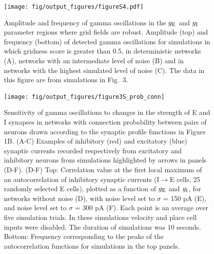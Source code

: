 \documentclass[a4paper,12pt]{article}
\newcommand{\ssc}[3]{\ensuremath{#1_{\text{#2}_{\text{#3}}}}}
\newcommand{\gE      }{\ssc{g}      {\scriptsize{E}}{}}
\newcommand{\gI      }{\ssc{g}      {\scriptsize{I}}{}}
\begin{document}
\clearpage

\begin{figure}[p]
    \internallinenumbers
    \centering
        \texttt{[image: fig/output\_figures/figureS4.pdf]}
    \caption{Amplitude and frequency of gamma oscillations in the $\gE$ and
    $\gI$ parameter regions where grid fields are robust. Amplitude (top) and
    frequency (bottom) of detected gamma oscillations for simulations in which
    gridness score is greater than 0.5, in deterministic networks (A), networks
    with an intermediate level of noise (B) and in networks with the highest
    simulated level of noise (C). The data in this figure are from simulations
    in Fig.~3.}
\end{figure}

\clearpage

\begin{figure}[p]
    \internallinenumbers
    \centering
        \texttt{[image: fig/output\_figures/figure3S\_prob\_conn]}
\end{figure}

\clearpage

\begin{figure}[H]
    \internallinenumbers
    \caption{Sensitivity of gamma oscillations to changes in the strength of E
    and I synapses in networks with connection probability between pairs of
    neurons drawn according to the synaptic profile functions in Figure 1B.
    (A-C) Examples of inhibitory (red) and excitatory (blue) synaptic currents
    recorded respectively from excitatory and inhibitory neurons from
    simulations highlighted by arrows in panels (D-F).  (D-F) Top: Correlation
    value at the first local maximum of an autocorrelation of inhibitory
    synaptic currents (I$\rightarrow$E cells, 25 randomly selected E cells),
    plotted as a function of $\gE$ and $\gI$, for networks without noise (D), with
    noise level set to $\sigma$ = 150 pA (E), and noise level set to $\sigma$ =
    300 pA (F). Each point is an average over five simulation trials. In these
    simulations velocity and place cell inputs were disabled.  The duration of
    simulations was 10 seconds.  Bottom: Frequency corresponding to the peaks
    of the autocorrelation functions for simulations in the top panels.}
\end{figure}

\clearpage
\end{document}
